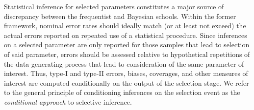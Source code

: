 \documentclass[pdflatex,sn-chicago]{sn-jnl}%
\theoremstyle{thmstyleone}%
\theoremstyle{thmstyletwo}%
\theoremstyle{thmstylethree}%
\begin{document}
Statistical inference for selected parameters constitutes a major source of discrepancy between the frequentist and Bayesian schools. Within the former framework, nominal error rates should ideally match (or at least not exceed) the actual errors reported on repeated use of a statistical procedure. Since inferences on a selected parameter are only reported for those samples that lead to selection of said parameter, errors should be assessed relative to hypothetical repetitions of the data-generating process that lead to consideration of the same parameter of interest. Thus, type-I and type-II errors, biases, coverages, and other measures of interest are computed conditionally on the output of the selection stage. We refer to the general principle of conditioning inferences on the selection event as the \textit{conditional approach} to selective inference. 
\end{document}

